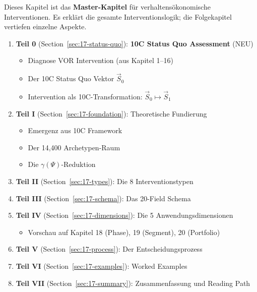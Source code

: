\begin{tcolorbox}[colback=green!5!white, colframe=green!75!black,
    title=Kapitelübersicht]

Dieses Kapitel ist das \textbf{Master-Kapitel} für verhaltensökonomische Interventionen. Es erklärt die gesamte Interventionslogik; die Folgekapitel vertiefen einzelne Aspekte.

\begin{enumerate}
\item \textbf{Teil 0} (Section~\ref{sec:17-status-quo}): \textbf{10C Status Quo Assessment} (NEU)
    \begin{itemize}[nosep]
    \item Diagnose VOR Intervention (aus Kapitel 1--16)
    \item Der 10C Status Quo Vektor $\vec{S}_0$
    \item Intervention als 10C-Transformation: $\vec{S}_0 \mapsto \vec{S}_1$
    \end{itemize}
\item \textbf{Teil I} (Section~\ref{sec:17-foundation}): Theoretische Fundierung
    \begin{itemize}[nosep]
    \item Emergenz aus 10C Framework
    \item Der 14,400 Archetypen-Raum
    \item Die $\gamma(\Psi)$-Reduktion
    \end{itemize}
\item \textbf{Teil II} (Section~\ref{sec:17-types}): Die 8 Interventionstypen
\item \textbf{Teil III} (Section~\ref{sec:17-schema}): Das 20-Field Schema
\item \textbf{Teil IV} (Section~\ref{sec:17-dimensions}): Die 5 Anwendungsdimensionen
    \begin{itemize}[nosep]
    \item Vorschau auf Kapitel 18 (Phase), 19 (Segment), 20 (Portfolio)
    \end{itemize}
\item \textbf{Teil V} (Section~\ref{sec:17-process}): Der Entscheidungsprozess
\item \textbf{Teil VI} (Section~\ref{sec:17-examples}): Worked Examples
\item \textbf{Teil VII} (Section~\ref{sec:17-summary}): Zusammenfassung und Reading Path
\end{enumerate}
\end{tcolorbox}


